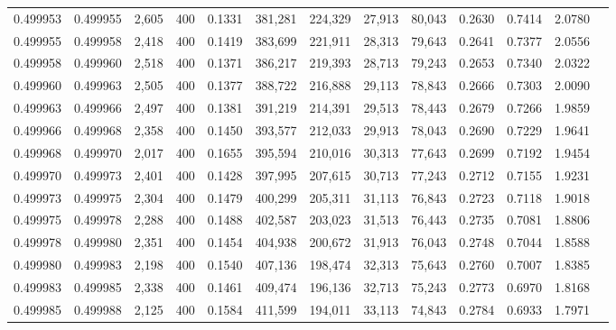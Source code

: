 \begin{tabular}{rrrrrrrrrrrrr}
0.499953 & 0.499955 &  2,605 & 400 &                                     0.1331 & 381,281 & 224,329 &  27,913 &  80,043 & 0.2630 & 0.7414 & 2.0780 \\
0.499955 & 0.499958 &  2,418 & 400 &                                     0.1419 & 383,699 & 221,911 &  28,313 &  79,643 & 0.2641 & 0.7377 & 2.0556 \\
0.499958 & 0.499960 &  2,518 & 400 &                                     0.1371 & 386,217 & 219,393 &  28,713 &  79,243 & 0.2653 & 0.7340 & 2.0322 \\
0.499960 & 0.499963 &  2,505 & 400 &                                     0.1377 & 388,722 & 216,888 &  29,113 &  78,843 & 0.2666 & 0.7303 & 2.0090 \\
0.499963 & 0.499966 &  2,497 & 400 &                                     0.1381 & 391,219 & 214,391 &  29,513 &  78,443 & 0.2679 & 0.7266 & 1.9859 \\
0.499966 & 0.499968 &  2,358 & 400 &                                     0.1450 & 393,577 & 212,033 &  29,913 &  78,043 & 0.2690 & 0.7229 & 1.9641 \\
0.499968 & 0.499970 &  2,017 & 400 &                                     0.1655 & 395,594 & 210,016 &  30,313 &  77,643 & 0.2699 & 0.7192 & 1.9454 \\
0.499970 & 0.499973 &  2,401 & 400 &                                     0.1428 & 397,995 & 207,615 &  30,713 &  77,243 & 0.2712 & 0.7155 & 1.9231 \\
0.499973 & 0.499975 &  2,304 & 400 &                                     0.1479 & 400,299 & 205,311 &  31,113 &  76,843 & 0.2723 & 0.7118 & 1.9018 \\
0.499975 & 0.499978 &  2,288 & 400 &                                     0.1488 & 402,587 & 203,023 &  31,513 &  76,443 & 0.2735 & 0.7081 & 1.8806 \\
0.499978 & 0.499980 &  2,351 & 400 &                                     0.1454 & 404,938 & 200,672 &  31,913 &  76,043 & 0.2748 & 0.7044 & 1.8588 \\
0.499980 & 0.499983 &  2,198 & 400 &                                     0.1540 & 407,136 & 198,474 &  32,313 &  75,643 & 0.2760 & 0.7007 & 1.8385 \\
0.499983 & 0.499985 &  2,338 & 400 &                                     0.1461 & 409,474 & 196,136 &  32,713 &  75,243 & 0.2773 & 0.6970 & 1.8168 \\
0.499985 & 0.499988 &  2,125 & 400 &                                     0.1584 & 411,599 & 194,011 &  33,113 &  74,843 & 0.2784 & 0.6933 & 1.7971 \\

\end{tabular}
